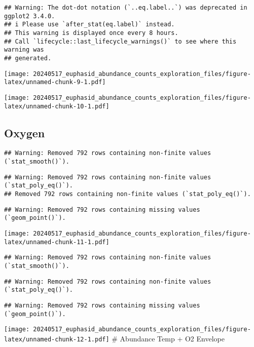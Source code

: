 \documentclass[
]{article}
\begin{document}
\begin{verbatim}
## Warning: The dot-dot notation (`..eq.label..`) was deprecated in ggplot2 3.4.0.
## i Please use `after_stat(eq.label)` instead.
## This warning is displayed once every 8 hours.
## Call `lifecycle::last_lifecycle_warnings()` to see where this warning was
## generated.
\end{verbatim}

\texttt{[image: 20240517\_euphasid\_abundance\_counts\_exploration\_files/figure-latex/unnamed-chunk-9-1.pdf]}

\texttt{[image: 20240517\_euphasid\_abundance\_counts\_exploration\_files/figure-latex/unnamed-chunk-10-1.pdf]}

\hypertarget{oxygen}{%
\subsection{Oxygen}\label{oxygen}}

\begin{verbatim}
## Warning: Removed 792 rows containing non-finite values (`stat_smooth()`).
\end{verbatim}

\begin{verbatim}
## Warning: Removed 792 rows containing non-finite values (`stat_poly_eq()`).
## Removed 792 rows containing non-finite values (`stat_poly_eq()`).
\end{verbatim}

\begin{verbatim}
## Warning: Removed 792 rows containing missing values (`geom_point()`).
\end{verbatim}

\texttt{[image: 20240517\_euphasid\_abundance\_counts\_exploration\_files/figure-latex/unnamed-chunk-11-1.pdf]}

\begin{verbatim}
## Warning: Removed 792 rows containing non-finite values (`stat_smooth()`).
\end{verbatim}

\begin{verbatim}
## Warning: Removed 792 rows containing non-finite values (`stat_poly_eq()`).
\end{verbatim}

\begin{verbatim}
## Warning: Removed 792 rows containing missing values (`geom_point()`).
\end{verbatim}

\texttt{[image: 20240517\_euphasid\_abundance\_counts\_exploration\_files/figure-latex/unnamed-chunk-12-1.pdf]}
\# Abundance Temp + O2 Envelope
\end{document}
